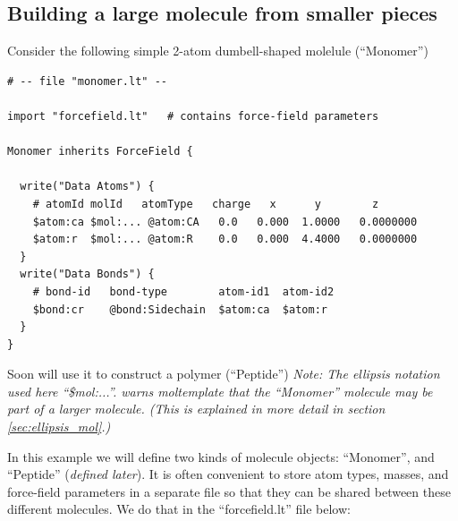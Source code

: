 \documentclass[11pt]{article}
\begin{document}
\pagebreak

\subsection{Building a large molecule from smaller pieces}
\label{sec:2bead}
Consider the following simple 2-atom dumbell-shaped molelule (``Monomer'')
\begin{verbatim}
# -- file "monomer.lt" --

import "forcefield.lt"   # contains force-field parameters

Monomer inherits ForceField {

  write("Data Atoms") {
    # atomId molId   atomType   charge   x      y        z      
    $atom:ca $mol:... @atom:CA   0.0   0.000  1.0000   0.0000000
    $atom:r  $mol:... @atom:R    0.0   0.000  4.4000   0.0000000
  }
  write("Data Bonds") {
    # bond-id   bond-type        atom-id1  atom-id2
    $bond:cr    @bond:Sidechain  $atom:ca  $atom:r
  }
}
\end{verbatim}


Soon will use it to construct a polymer (``Peptide'')
\textit{Note: The ellipsis notation used here ``\$mol:...''.
warns moltemplate that the ``Monomer'' molecule may be part of a larger
molecule.
(This is explained in more detail in section \ref{sec:ellipsis_mol}.)
}

In this example we will define two kinds of molecule objects:
``Monomer'', and ``Peptide'' (\textit{defined later}).
It is often convenient to store atom types, masses, and force-field 
parameters in a separate file so that they
can be shared between these different molecules.
We do that in the ``forcefield.lt'' file below:
\end{document}
